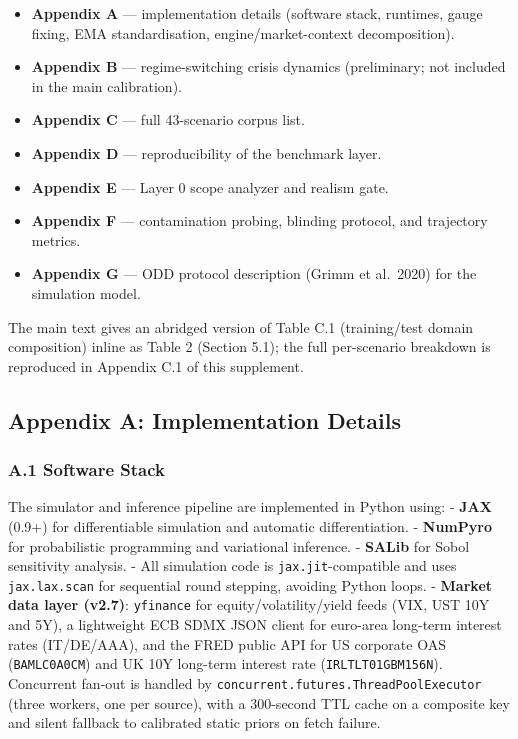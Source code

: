 \documentclass[
]{article}
\providecommand{\tightlist}{%
  \setlength{\itemsep}{0pt}\setlength{\parskip}{0pt}}
\begin{document}
\begin{itemize}
\tightlist
\item
  \textbf{Appendix A} --- implementation details (software stack,
  runtimes, gauge fixing, EMA standardisation, engine/market-context
  decomposition).
\item
  \textbf{Appendix B} --- regime-switching crisis dynamics (preliminary;
  not included in the main calibration).
\item
  \textbf{Appendix C} --- full 43-scenario corpus list.
\item
  \textbf{Appendix D} --- reproducibility of the benchmark layer.
\item
  \textbf{Appendix E} --- Layer 0 scope analyzer and realism gate.
\item
  \textbf{Appendix F} --- contamination probing, blinding protocol, and
  trajectory metrics.
\item
  \textbf{Appendix G} --- ODD protocol description (Grimm et al.~2020)
  for the simulation model.
\end{itemize}

The main text gives an abridged version of Table C.1 (training/test
domain composition) inline as Table 2 (Section 5.1); the full
per-scenario breakdown is reproduced in Appendix C.1 of this supplement.

\subsection{Appendix A: Implementation
Details}\label{appendix-a-implementation-details}

\subsubsection{A.1 Software Stack}\label{a.1-software-stack}

The simulator and inference pipeline are implemented in Python using: -
\textbf{JAX} (0.9+) for differentiable simulation and automatic
differentiation. - \textbf{NumPyro} for probabilistic programming and
variational inference. - \textbf{SALib} for Sobol sensitivity analysis.
- All simulation code is \texttt{jax.jit}-compatible and uses
\texttt{jax.lax.scan} for sequential round stepping, avoiding Python
loops. - \textbf{Market data layer (v2.7)}: \texttt{yfinance} for
equity/volatility/yield feeds (VIX, UST 10Y and 5Y), a lightweight ECB
SDMX JSON client for euro-area long-term interest rates (IT/DE/AAA), and
the FRED public API for US corporate OAS (\texttt{BAMLC0A0CM}) and UK
10Y long-term interest rate (\texttt{IRLTLT01GBM156N}). Concurrent
fan-out is handled by \texttt{concurrent.futures.ThreadPoolExecutor}
(three workers, one per source), with a 300-second TTL cache on a
composite key and silent fallback to calibrated static priors on fetch
failure.
\end{document}
